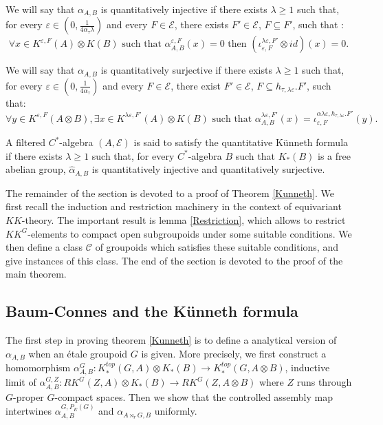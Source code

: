 We will say that $\alpha_{A,B}$ is quantitatively injective if there exists $\lambda \geq 1$ such that, for every $\varepsilon\in (0,\frac{1}{4\alpha_\tau \lambda})$ and every $F\in\mathcal E$, there exists $F'\in\mathcal E$, $F\subseteq F'$, such that : 
\[\forall x\in K^{\varepsilon,F}(A)\otimes K(B)\text{ such that }\alpha_{A,B}^{\varepsilon,F}(x)=0 \text{ then }(\iota_{\varepsilon,F}^{\lambda\varepsilon,F'}\otimes id) (x) = 0.\] 

We will say that $\alpha_{A,B}$ is quantitatively surjective if there exists $\lambda \geq 1$ such that, for every $\varepsilon \in (0,\frac{1}{4\alpha_\tau})$ and every $F\in\mathcal E$, there exist $F'\in\mathcal E$, $F\subseteq h_{\tau,\lambda\varepsilon}.F'$, such that:
\[ \forall y\in K^{\varepsilon,F}(A\otimes B), \exists x\in K^{\lambda\varepsilon, F'}(A)\otimes K(B) \text{ such that }
\alpha^{\lambda\varepsilon,F'}_{A,B}(x)=\iota_{\varepsilon,F}^{\alpha\lambda\varepsilon,h_{\tau, \lambda\varepsilon}.F'}(y).\] 


\begin{definition}
A filtered $C^*$-algebra $(A,\mathcal E)$ is said to satisfy the quantitative Künneth formula if there exists $\lambda \geq 1$ such that, for every $C^*$-algebra $B$ such that $K_*(B)$ is a free abelian group, $\hat\alpha_{A,B}$ is quantitatively injective and quantitatively surjective. 
\end{definition}

The remainder of the section is devoted to a proof of Theorem \ref{Kunneth}. We first recall the induction and restriction machinery in the context of equivariant $KK$-theory. The important result is lemma \ref{Restriction}, which allows to restrict $KK^G$-elements to compact open subgroupoids under some suitable conditions. We then define a class $\mathcal C$ of groupoids which satisfies these suitable conditions, and give instances of this class. The end of the section is devoted to the proof of the main theorem.



\subsection{Baum-Connes and the Künneth formula}
The first step in proving theorem \ref{Kunneth} is to define a analytical version of $\alpha_{A,B}$ when an étale groupoid $G$ is given. More precisely, we first construct a homomorphism $\alpha_{A,B}^G : K_*^{top}(G,A)\otimes K_*(B)\rightarrow K_*^{top}(G,A\otimes B )$, inductive limit of $\alpha_{A,B}^{G,Z} : RK^G(Z,A)\otimes K_*(B)\rightarrow RK^G(Z,A\otimes B )$ where $Z$ runs through $G$-proper $G$-compact spaces. Then we show that the controlled assembly map intertwines $\alpha^{G,P_E(G)}_{A,B}$ and $\alpha_{A\rtimes_r G,B}$ uniformly.\\

